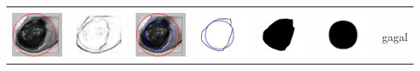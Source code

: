 \begin{table}[H]
\begin{tabular}{|m{0.7in}|m{0.7in}|m{0.7in}|m{0.7in}|m{0.7in}|m{0.7in}|m{0.7in}|}
		&  &  & & & &  \\
		\includegraphics[width=0.7in]{dataset/dataset_3/luka_hitam/ready/17_integer_init.jpg}&
		\includegraphics[width=0.7in]{dataset/dataset_3/luka_hitam/ready/17_integer_ext.jpg}&
		\includegraphics[width=0.7in]{dataset/dataset_3/luka_hitam/ready/17_integer_result.jpg}&
		\includegraphics[width=0.7in]{dataset/dataset_3/luka_hitam/ready/17_gt_r_integer.jpg}&
		\includegraphics[width=0.7in]{dataset/dataset_3/luka_hitam/ready/17_r.jpg}&
		\includegraphics[width=0.7in]{dataset/dataset_3/luka_hitam/ready/17_integer_r.jpg}&
		gagal\\
		\hline
		

\end{tabular}
\end{table}

